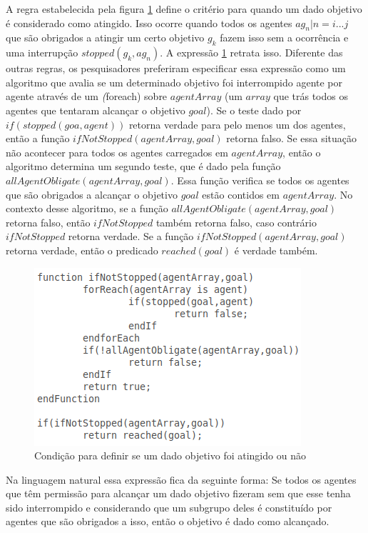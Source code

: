 A regra estabelecida pela figura \ref{wenStop} define o critério para quando um dado objetivo é considerado como atingido. Isso ocorre quando todos os agentes $ag_n | n = i ... j$ que são obrigados a atingir um certo objetivo $ g_k $ fazem isso sem a ocorrência e uma interrupção $stopped(g_k,ag_n)$. A expressão \ref{wenStop} retrata isso. Diferente das outras regras, os pesquisadores preferiram especificar essa expressão como um algoritmo que avalia se um determinado objetivo foi interrompido agente por agente através de um \textit(foreach) sobre $agentArray$ (um $array$ que trás todos os agentes que tentaram alcançar o objetivo $goal$). Se o teste dado por $if(stopped(goa,agent))$ retorna verdade para pelo menos um dos agentes, então a função $ifNotStopped(agentArray,goal)$ retorna falso. Se essa situação não acontecer para todos os agentes carregados em $agentArray$, então o algoritmo determina um segundo teste, que é dado pela função $allAgentObligate(agentArray,goal)$. Essa função verifica se todos os agentes que são obrigados a alcançar o objetivo $goal$ estão contidos em $agentArray$. No contexto desse algoritmo, se a função $allAgentObligate(agentArray,goal)$ retorna falso, então $ifNotStopped$ também retorna falso, caso contrário $ifNotStopped$ retorna verdade. Se a função $ifNotStopped(agentArray,goal)$ retorna verdade, então o predicado $reached(goal)$ é verdade também.

\begin{figure}[H]
  \centering
  \includegraphics[width=0.6\linewidth]{figure/algfigthree.png} 
  \caption{Condição para definir se um dado objetivo foi atingido ou não} \label{wenStop}  
\end{figure}

Na linguagem natural essa expressão fica da seguinte forma: Se todos os agentes que têm permissão para alcançar um dado objetivo fizeram sem que esse tenha sido interrompido e considerando que um subgrupo deles é constituído por agentes que são obrigados a isso, então o objetivo é dado como alcançado.

